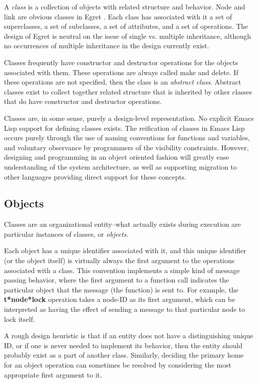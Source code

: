 A {\em class}\/ is a collection of objects with related structure and
behavior.  {\sf Node} and {\sf link} are obvious classes in Egret . Each class
has associated with it a set of superclasses, a set of subclasses, a set of
attributes, and a set of operations.  The design of Egret  is  neutral on the
issue of single vs.  multiple inheritance, although no occurrences of multiple
inheritance in the design currently exist.

Classes frequently have constructor and destructor operations for the
objects associated with them.  These operations are always called {\sf
make} and {\sf delete}. If these operations are not specified, then
the class is an {\em abstract class}. Abstract classes exist to
collect together related structure that is inherited by other classes
that do have constructor and destructor operations.

Classes are, in some sense, purely a design-level representation. No
explicit Emacs Lisp support for defining classes exists.  The
reification of classes in Emacs Lisp occurs purely through the use of
naming conventions for functions and variables, and voluntary
observance by programmers of the visibility constraints.  However,
designing and programming in an object oriented fashion will greatly
ease understanding of the system architecture, as well as supporting
migration to other languages providing direct support for these
concepts.

\subsection{Objects} 

Classes are an organizational entity--what actually exists during
execution are particular instances of classes, or {\em objects}.

Each object has a unique identifier associated with it, and this
unique identifier (or the object itself) is virtually always the first
argument to the operations associated with a class.  This convention
implements a simple kind of message passing behavior, where the first
argument to a function call indicates the particular object that the
message (the function) is sent to.  For example, the {\bf t*node*lock}
operation takes a node-ID as its first argument, which can be
interpreted as having the effect of sending a message to that
particular node to lock itself.

A rough design heuristic is that if an entity does not have a
distinguishing unique ID, or if one is never needed to implement its
behavior, then the entity should probably exist as a part of another
class.  Similarly, deciding the primary home for an object operation
can sometimes be resolved by considering the most appropriate first
argument to it.

